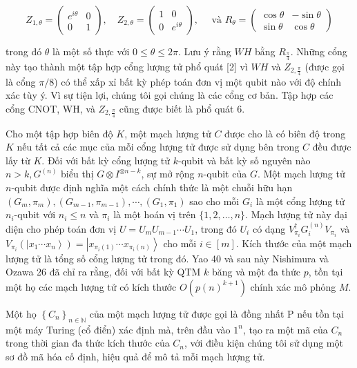 \documentclass[10pt]{article}
\begin{document}
$$
Z_{1, \theta}=\left(\begin{array}{cc}
e^{i \theta} & 0 \\
0 & 1
\end{array}\right), \quad Z_{2, \theta}=\left(\begin{array}{cc}
1 & 0 \\
0 & e^{i \theta}
\end{array}\right), \quad \text { và } R_{\theta}=\left(\begin{array}{rr}
\cos \theta & -\sin \theta \\
\sin \theta & \cos \theta
\end{array}\right)
$$

trong đó $\theta$ là một số thực với $0 \leq \theta \leq 2 \pi$. Lưu ý rằng $W H$ bằng $R_{\frac{\pi}{4}}$. Những cổng này tạo thành một tập hợp cổng lượng tử phổ quát [2] vì $W H$ và $Z_{2, \frac{\pi}{4}}$ (được gọi là cổng $\pi / 8$) có thể xấp xỉ bất kỳ phép toán đơn vị một qubit nào với độ chính xác tùy ý. Vì sự tiện lợi, chúng tôi gọi chúng là các cổng cơ bản. Tập hợp các cổng CNOT, WH, và $Z_{2, \frac{\pi}{4}}$ cũng được biết là phổ quát 6.

Cho một tập hợp biên độ $K$, một mạch lượng tử $C$ được cho là có biên độ trong $K$ nếu tất cả các mục của mỗi cổng lượng tử được sử dụng bên trong $C$ đều được lấy từ $K$. Đối với bất kỳ cổng lượng tử $k$-qubit và bất kỳ số nguyên nào $n>k, G^{(n)}$ biểu thị $G \otimes I^{\otimes n-k}$, sự mở rộng $n$-qubit của $G$. Một mạch lượng tử $n$-qubit được định nghĩa một cách chính thức là một chuỗi hữu hạn $\left(G_{m}, \pi_{m}\right),\left(G_{m-1}, \pi_{m-1}\right), \cdots,\left(G_{1}, \pi_{1}\right)$ sao cho mỗi $G_{i}$ là một cổng lượng tử $n_{i}$-qubit với $n_{i} \leq n$ và $\pi_{i}$ là một hoán vị trên $\{1,2, \ldots, n\}$. Mạch lượng tử này đại diện cho phép toán đơn vị $U=U_{m} U_{m-1} \cdots U_{1}$, trong đó $U_{i}$ có dạng $V_{\pi_{i}}^{\dagger} G_{i}^{(n)} V_{\pi_{i}}$ và $V_{\pi_{i}}\left(\left|x_{1} \cdots x_{n}\right\rangle\right)=\left|x_{\pi_{i}(1)} \cdots x_{\pi_{i}(n)}\right\rangle$ cho mỗi $i \in[m]$. Kích thước của một mạch lượng tử là tổng số cổng lượng tử trong đó. Yao 40 và sau này Nishimura và Ozawa 26 đã chỉ ra rằng, đối với bất kỳ QTM $k$ băng và một đa thức $p$, tồn tại một họ các mạch lượng tử có kích thước $O\left(p(n)^{k+1}\right)$ chính xác mô phỏng $M$.

Một họ $\left\{C_{n}\right\}_{n \in \mathbb{N}}$ của một mạch lượng tử được gọi là đồng nhất P nếu tồn tại một máy Turing (cổ điển) xác định mà, trên đầu vào $1^{n}$, tạo ra một mã của $C_{n}$ trong thời gian đa thức kích thước của $C_{n}$, với điều kiện chúng tôi sử dụng một sơ đồ mã hóa cố định, hiệu quả để mô tả mỗi mạch lượng tử.
\end{document}
